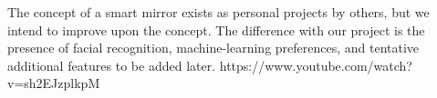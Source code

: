 The concept of a smart mirror exists as personal projects by others, but we intend to improve upon the concept. The difference with our project is the presence of facial recognition, machine-learning preferences, and tentative additional features to be added later.\newline
https://www.youtube.com/watch?v=sh2EJzplkpM
